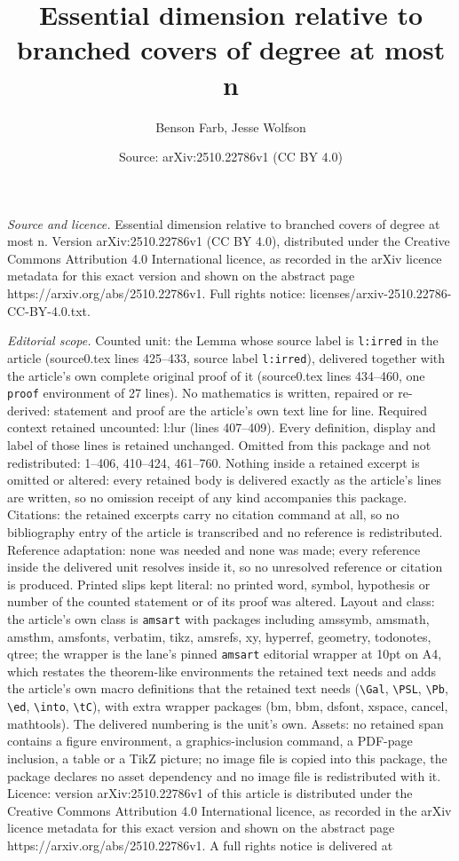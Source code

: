 \documentclass[10pt,a4paper]{amsart}
\title[Essential dimension relative to branched covers of degree at]{Essential dimension relative to branched covers of degree at most n}
\author{Benson Farb, Jesse Wolfson}
\date{Source: arXiv:2510.22786v1 (CC BY 4.0)}
\begin{document}
\maketitle

\noindent\emph{Source and licence.} Essential dimension relative to branched covers of degree at most n. Version arXiv:2510.22786v1 (CC BY 4.0), distributed under the Creative Commons Attribution 4.0 International licence, as recorded in the arXiv licence metadata for this exact version and shown on the abstract page https://arxiv.org/abs/2510.22786v1. Full rights notice: licenses/arxiv-2510.22786-CC-BY-4.0.txt.\par\smallskip

\noindent\textit{Editorial scope.} Counted unit: the Lemma whose source label is \texttt{l:irred} in the article (source0.tex lines 425--433, source label \texttt{l:irred}), delivered together with the article's own complete original proof of it (source0.tex lines 434--460, one \texttt{proof} environment of 27 lines). No mathematics is written, repaired or re-derived: statement and proof are the article's own text line for line. Required context retained uncounted: l:lur (lines 407--409). Every definition, display and label of those lines is retained unchanged. Omitted from this package and not redistributed: 1--406, 410--424, 461--760. Nothing inside a retained excerpt is omitted or altered: every retained body is delivered exactly as the article's lines are written, so no omission receipt of any kind accompanies this package. Citations: the retained excerpts carry no citation command at all, so no bibliography entry of the article is transcribed and no reference is redistributed. Reference adaptation: none was needed and none was made; every reference inside the delivered unit resolves inside it, so no unresolved reference or citation is produced. Printed slips kept literal: no printed word, symbol, hypothesis or number of the counted statement or of its proof was altered. Layout and class: the article's own class is \texttt{amsart} with packages including amssymb, amsmath, amsthm, amsfonts, verbatim, tikz, amsrefs, xy, hyperref, geometry, todonotes, qtree; the wrapper is the lane's pinned \texttt{amsart} editorial wrapper at 10pt on A4, which restates the theorem-like environments the retained text needs and adds the article's own macro definitions that the retained text needs (\texttt{\textbackslash Gal}, \texttt{\textbackslash PSL}, \texttt{\textbackslash Pb}, \texttt{\textbackslash ed}, \texttt{\textbackslash into}, \texttt{\textbackslash tC}), with extra wrapper packages (bm, bbm, dsfont, xspace, cancel, mathtools). The delivered numbering is the unit's own. Assets: no retained span contains a figure environment, a graphics-inclusion command, a PDF-page inclusion, a table or a TikZ picture; no image file is copied into this package, the package declares no asset dependency and no image file is redistributed with it. Licence: version arXiv:2510.22786v1 of this article is distributed under the Creative Commons Attribution 4.0 International licence, as recorded in the arXiv licence metadata for this exact version and shown on the abstract page https://arxiv.org/abs/2510.22786v1. A full rights notice is delivered at 
\end{document}
